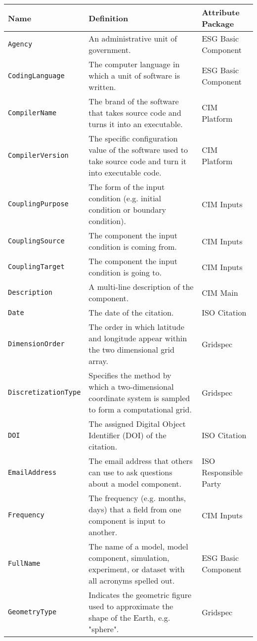 \begin{tabular}{|p{6cm}|p{10cm}|p{10cm}}
     \hline\hline
     {\bf Name} & {\bf Definition} & {\bf Attribute Package}\\
     \hline\hline
     {\tt Agency} & An administrative unit of government.& ESG Basic Component\\
     {\tt CodingLanguage} & The computer language in which a unit of software is written. & ESG Basic Component\\
     {\tt CompilerName} & The brand of the software that takes source code and turns it into an executable.& CIM Platform\\
     {\tt CompilerVersion} & The specific configuration value of the software used to take source code and turn it into executable code. & CIM Platform\\
     {\tt CouplingPurpose} & The form of the input condition (e.g. initial condition or boundary condition). &  CIM Inputs \\
     {\tt CouplingSource} & The component the input condition is coming from. & CIM Inputs\\ 
     {\tt CouplingTarget} & The component the input condition is going to. & CIM Inputs\\ 
     {\tt Description} & A multi-line description of the component. & CIM Main \\
     {\tt Date} & The date of the citation. & ISO Citation\\
     {\tt DimensionOrder} & The order in which latitude and longitude appear within the two dimensional grid array. & Gridspec\\ 
     {\tt DiscretizationType} & Specifies the method by which a two-dimensional coordinate system is sampled to form a computational grid.& Gridspec \\
     {\tt DOI} & The assigned Digital Object Identifier (DOI) of the citation. & ISO Citation\\
     {\tt EmailAddress} & The email address that others can use to ask questions about a model component. & ISO Responsible Party\\
     {\tt Frequency} & The frequency (e.g. months, days) that a field from one component is input to another. & CIM Inputs\\ 
     {\tt FullName} & The name of a model, model component, simulation, experiment, or dataset with all acronyms spelled out.& ESG Basic Component\\
     {\tt GeometryType} & Indicates the geometric figure used to approximate the shape of the Earth, e.g. "sphere". & Gridspec \\

\end{tabular}
